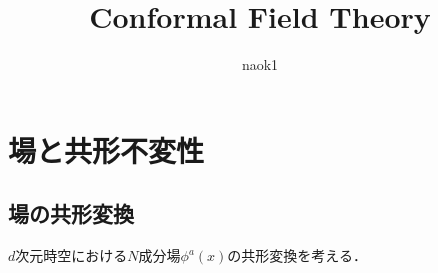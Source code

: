 \documentclass[dvipdfmx,uplatex,b5paper,9pt]{jsreport}
\title{Conformal Field Theory}
\author{naok1} %
\theoremstyle{definition}
\theoremstyle{definition}
\theoremstyle{definition}
\theoremstyle{definition}
\theoremstyle{definition}
\theoremstyle{definition}
\theoremstyle{definition}
\theoremstyle{definition}
\theoremstyle{definition}
\begin{document}
\maketitle
\tableofcontents

\chapter{場と共形不変性}
\section{場の共形変換}
\(d\)次元時空における\(N\)成分場\(\phi^{a}(x)\)の共形変換を考える．


\end{document}
